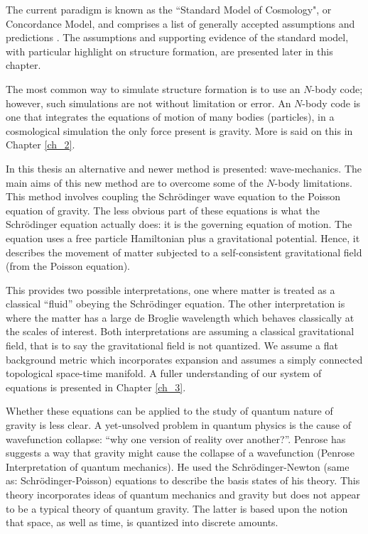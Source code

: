 The current paradigm is known as the ``Standard Model of Cosmology", or Concordance Model, and comprises a list of generally accepted assumptions and predictions \citep{bib_lah}. The assumptions and supporting evidence of the standard model, with particular highlight on structure formation, are presented later in this chapter.

The most common way to simulate structure formation is to use an $N$-body code; however, such simulations are not without limitation or error. An $N$-body code is one that integrates the equations of motion of many bodies (particles), in a cosmological simulation the only force present is gravity. More is said on this in Chapter \ref{ch_2}.

In this thesis an alternative and newer method is presented: wave-mechanics. The main aims of this new method are to overcome some of the $N$-body limitations. This method involves coupling the Schr\"odinger wave equation to the Poisson equation of gravity. The less obvious part of these equations is what the Schr\"odinger equation actually does: it is the governing equation of motion. The equation uses a free particle Hamiltonian  plus a gravitational potential. Hence, it describes the movement of matter subjected to a self-consistent gravitational field (from the Poisson equation). %

This provides two possible interpretations, one where matter is treated as a classical ``fluid'' obeying the Schr\"odinger equation. The other interpretation is where the matter has a large de Broglie wavelength which behaves classically at the scales of interest. Both interpretations are assuming a classical gravitational field, that is to say the gravitational field is not quantized. We assume a flat background metric which incorporates expansion and assumes a simply connected topological space-time manifold. A fuller understanding of our system of equations is presented in Chapter \ref{ch_3}.

Whether these equations can be applied to the study of quantum nature of gravity is less clear. A yet-unsolved problem in quantum physics is the cause of wavefunction collapse: ``why one version of reality over another?''. Penrose \citep{bib_pen} has suggests a way that gravity might cause the collapse of a wavefunction (Penrose Interpretation of quantum mechanics). He used the Schr\"odinger-Newton (same as: Schr\"odinger-Poisson) equations to describe the basis states of his theory. This theory incorporates ideas of quantum mechanics and gravity but does not appear to be a typical theory of quantum gravity. The latter is based upon the notion that space, as well as time, is quantized into discrete amounts.


